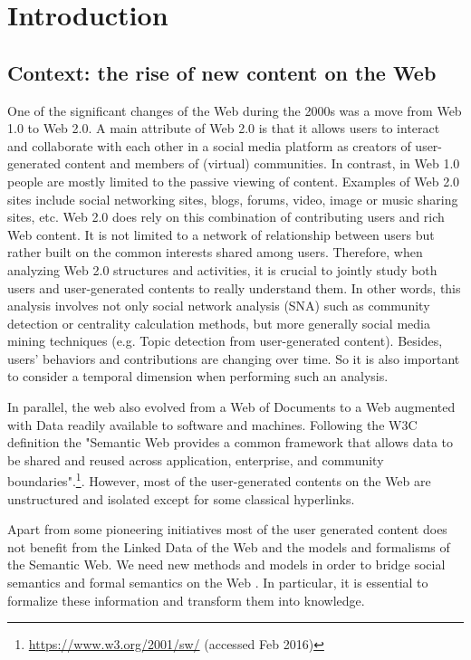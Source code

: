 
\chapter{Introduction}
\doublespacing
\label{chap:intro}
\minitoc
\section{Context: the rise of new content on the Web}

One of the significant changes of the Web during the 2000s was a move from Web 1.0 to Web 2.0. A main attribute of Web 2.0 is that it allows users to interact and collaborate with each other in a social media platform as creators of user-generated content\cite{moens2014mining} and members of (virtual) communities. In contrast, in Web 1.0 people are mostly limited to the passive viewing of content. Examples of Web 2.0 sites include social networking sites, blogs, forums, video, image or music sharing sites, etc. Web 2.0 does rely on this combination of contributing users and rich Web content. It is not limited to a network of relationship between users but rather built on the common interests shared among users. Therefore, when analyzing Web 2.0 structures and activities, it is crucial to jointly study both users and user-generated contents to really understand them. In other words, this analysis involves not only social network analysis (SNA) such as community detection or centrality calculation methods, but more generally social media mining techniques (e.g. Topic detection from user-generated content). Besides, users' behaviors and contributions are changing over time. So it is also important to consider a temporal dimension when performing such an analysis.


In parallel, the web also evolved from a Web of Documents to a Web augmented with Data readily available to software and machines. Following the W3C definition the "Semantic Web provides a common framework that allows data to be shared and reused across application, enterprise, and community boundaries".\footnote{\url{https://www.w3.org/2001/sw/} (accessed Feb 2016)}. However, most of the user-generated contents on the Web are unstructured and isolated except for some classical hyperlinks.


Apart from some pioneering initiatives \cite{chp1DBLP:journals/ijwbc/BreslinDHB06} \cite{chp1DBLP:journals/internet/BreslinD07} \cite{chp1DBLP:conf/webi/Mika04} \cite{chp1DBLP:conf/semweb/EreteoBGC09}  most of the user generated content does not benefit from the Linked Data of the Web and the models and formalisms of the Semantic Web. We need new methods and models in order to bridge social semantics and formal semantics on the Web \cite{gandon:hal-01059273}. In particular, it is essential to formalize these information and transform them into knowledge. 

